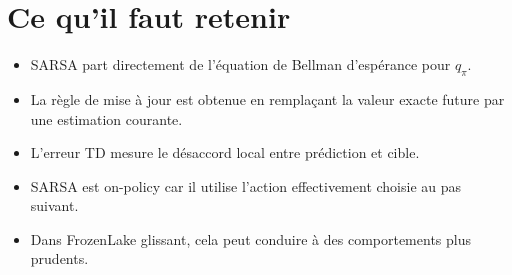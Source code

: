 \documentclass[11pt,a4paper]{article}
\begin{document}
\section{Ce qu'il faut retenir}

\begin{itemize}[leftmargin=1.6em]
    \item SARSA part directement de l'équation de Bellman d'espérance pour $q_{\pi}$.
    \item La règle de mise à jour est obtenue en remplaçant la valeur exacte future par une estimation courante.
    \item L'erreur TD mesure le désaccord local entre prédiction et cible.
    \item SARSA est on-policy car il utilise l'action effectivement choisie au pas suivant.
    \item Dans FrozenLake glissant, cela peut conduire à des comportements plus prudents.
\end{itemize}
\end{document}
